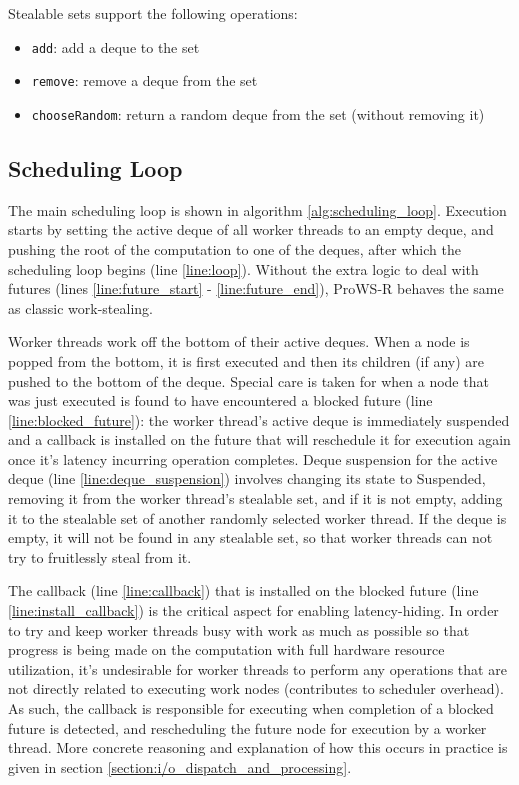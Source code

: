 \documentclass[bsc,frontabs,singlespacing,parskip,deptreport,normalheadings]{infthesis}
\begin{document}
Stealable sets support the following operations:

\begin{itemize}
    \item \texttt{add}: add a deque to the set
    \item \texttt{remove}: remove a deque from the set
    \item \texttt{chooseRandom}: return a random deque from the set (without
        removing it)
\end{itemize}

\subsection{Scheduling Loop}

The main scheduling loop is shown in algorithm \ref{alg:scheduling_loop}.
Execution starts by setting the active deque of all worker threads to an empty
deque, and pushing the root of the computation to one of the deques, after which
the scheduling loop begins (line \ref{line:loop}).
Without the extra logic to deal with futures (lines \ref{line:future_start} -
\ref{line:future_end}), ProWS-R behaves the same as classic work-stealing.

Worker threads work off the bottom of their active deques. When a node is popped
from the bottom, it is first executed and then its children (if any) are pushed
to the bottom of the deque. Special care is taken for when a node that was just
executed is found to have encountered a blocked future (line
\ref{line:blocked_future}): the worker thread's active deque is immediately
suspended and a callback is installed on the future that will reschedule it for
execution again once it's latency incurring operation completes. Deque
suspension for the active deque (line \ref{line:deque_suspension}) involves
changing its state to Suspended, removing it from the worker thread's stealable
set, and if it is not empty, adding it to the stealable set of another randomly
selected worker thread. If the deque is empty, it will not be found in any
stealable set, so that worker threads can not try to fruitlessly steal from it. 

The callback (line \ref{line:callback}) that is installed on the blocked future
(line \ref{line:install_callback}) is the critical aspect for enabling
latency-hiding. In order to try and keep worker threads busy with work as much
as possible so that progress is being made on the computation with full hardware
resource utilization, it's undesirable for worker threads to perform any
operations that are not directly related to executing work nodes (contributes to
scheduler overhead). As such, the callback is responsible for executing when
completion of a blocked future is detected, and rescheduling the future node for
execution by a worker thread. More concrete reasoning and explanation of how
this occurs in practice is given in section
\ref{section:i/o_dispatch_and_processing}.
\end{document}
